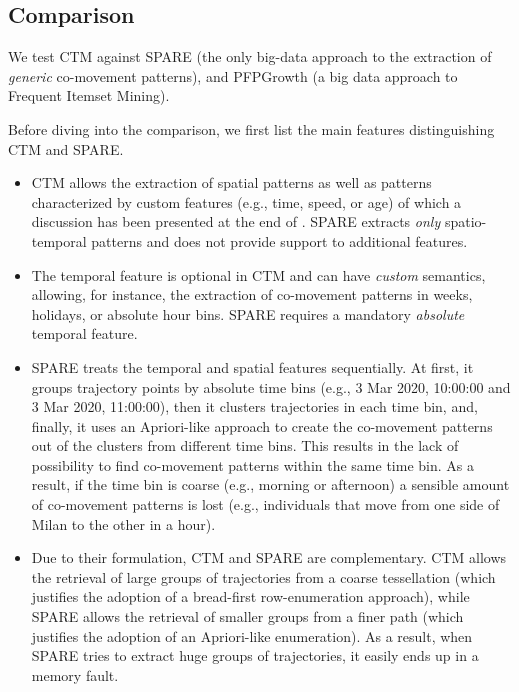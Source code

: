 \documentclass[preprint,12pt,authoryear]{elsarticle} %
\newcommand{\mf}[1]{#1}
\begin{document}
\subsection{Comparison}\label{ssec:comparison}
\mf{
We test CTM against SPARE \citep{DBLP:journals/pvldb/FanZWT16} (the only big-data approach to the extraction of \textit{generic} co-movement patterns), and PFPGrowth \citep{DBLP:conf/recsys/LiWZZC08} (a big data approach to Frequent Itemset Mining).

Before diving into the comparison, we first list the main features distinguishing CTM and SPARE.
}
\begin{itemize}
\item CTM allows the extraction of spatial patterns %
as well as patterns characterized by custom features (e.g., time, speed, or age) of which a discussion has been presented at the end of .
SPARE extracts \textit{only} spatio-temporal patterns and does not provide support to additional features.
\item The temporal feature is optional in CTM and can have \textit{custom} semantics, allowing, for instance, the extraction of co-movement patterns in weeks, holidays, or absolute hour bins. SPARE requires a mandatory \textit{absolute} temporal feature. 
\item SPARE treats the temporal and spatial features sequentially. At first, it groups trajectory points by absolute time bins (e.g., 3 Mar 2020, 10:00:00 and 3 Mar 2020, 11:00:00), then it clusters trajectories in each time bin, and, finally, it uses an Apriori-like approach to create the co-movement patterns out of the clusters from different time bins.
This results in the lack of possibility to find co-movement patterns within the same time bin.
As a result, if the time bin is coarse (e.g., morning or afternoon) a sensible amount of co-movement patterns is lost (e.g., individuals that move from one side of Milan to the other in a hour).
\item Due to their formulation, CTM and SPARE are complementary.
CTM allows the retrieval of large groups of trajectories from a coarse tessellation (which justifies the adoption of a bread-first row-enumeration approach), while SPARE allows the retrieval of smaller groups from a finer path (which justifies the adoption of an Apriori-like enumeration).
As a result, when SPARE tries to extract huge groups of trajectories, it easily ends up in a memory fault.
\end{itemize}
\end{document}
